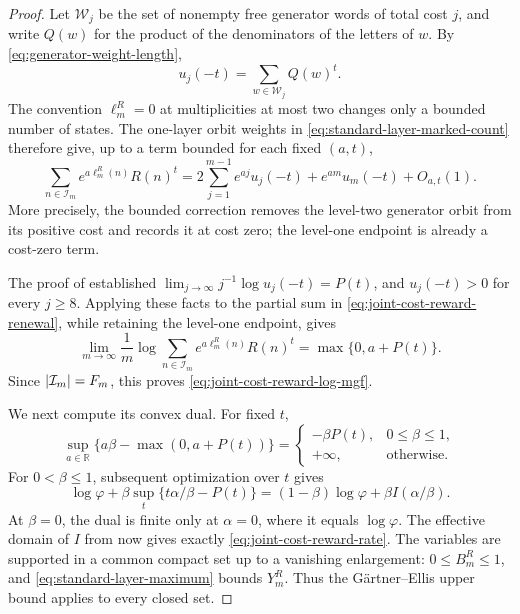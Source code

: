 \begin{proof}
Let \(\mathcal W_j\) be the set of nonempty free generator words of total
cost \(j\), and write \(Q(w)\) for the product of the denominators of the
letters of \(w\).  By \eqref{eq:generator-weight-length},
\begin{equation}
 u_j(-t)=\sum_{w\in\mathcal W_j}Q(w)^t.
 \label{eq:fixed-cost-word-partition}
\end{equation}
The convention \(\ell_m^R=0\) at multiplicities at most two changes only a
bounded number of states.  The one-layer orbit weights in
\eqref{eq:standard-layer-marked-count} therefore give, up to a term bounded
for each fixed \((a,t)\),
\begin{equation}
 \sum_{n\in\mathcal I_m}e^{a\ell_m^R(n)}R(n)^t
 =2\sum_{j=1}^{m-1}e^{aj}u_j(-t)+e^{am}u_m(-t)+O_{a,t}(1).
 \label{eq:joint-cost-reward-renewal}
\end{equation}
More precisely, the bounded correction removes the level-two generator orbit
from its positive cost and records it at cost zero; the level-one endpoint is
already a cost-zero term.

The proof of  established
\(\lim_{j\to\infty}j^{-1}\log u_j(-t)=P(t)\), and \(u_j(-t)>0\) for every
\(j\ge8\).  Applying these facts to the partial sum in
\eqref{eq:joint-cost-reward-renewal}, while retaining the level-one endpoint,
gives
\[
 \lim_{m\to\infty}\frac1m\log
 \sum_{n\in\mathcal I_m}e^{a\ell_m^R(n)}R(n)^t
 =\max\{0,a+P(t)\}.
\]
Since \(\lvert \mathcal I_m \rvert=F_m\), this proves
\eqref{eq:joint-cost-reward-log-mgf}.

We next compute its convex dual.  For fixed \(t\),
\[
 \sup_{a\in\mathbb R}\{a\beta-\max(0,a+P(t))\}
 =\begin{cases}
   -\beta P(t),&0\le\beta\le1,\\
   +\infty,&\text{otherwise}.
  \end{cases}
\]
For \(0<\beta\le1\), subsequent optimization over \(t\) gives
\[
 \log\varphi+\beta\sup_t\{t\alpha/\beta-P(t)\}
 =(1-\beta)\log\varphi+\beta I(\alpha/\beta).
\]
At \(\beta=0\), the dual is finite only at \(\alpha=0\), where it equals
\(\log\varphi\).  The effective domain of \(I\) from
 now gives exactly
\eqref{eq:joint-cost-reward-rate}.  The variables are supported in a common
compact set up to a vanishing enlargement: \(0\le B_m^R\le1\), and
\eqref{eq:standard-layer-maximum} bounds \(Y_m^R\).  Thus the
G\"artner--Ellis upper bound applies to every closed set.


\end{proof}
